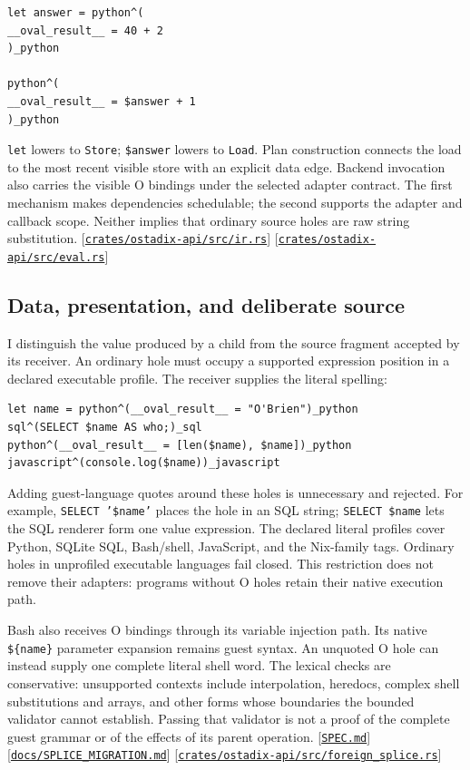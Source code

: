 \documentclass[11pt,oneside]{article}
\newcommand{\src}[1]{\textcolor{OSlate}{\scriptsize[\href{https://github.com/lostadi/OSTADIX/blob/c0b02c326b2329a95ba52447c7180bc93957cd57/#1}{\nolinkurl{#1}}]}\allowbreak}
\begin{document}
\begin{lstlisting}[style=ostyle]
let answer = python^(
__oval_result__ = 40 + 2
)_python

python^(
__oval_result__ = $answer + 1
)_python
\end{lstlisting}

\texttt{let} lowers to \texttt{Store}; \texttt{\$answer} lowers to
\texttt{Load}. Plan construction connects the load to the most recent visible
store with an explicit data edge. Backend invocation also carries the visible O bindings under the selected
adapter contract. The first mechanism makes dependencies schedulable; the
second supports the adapter and callback scope. Neither implies that ordinary
source holes are raw string substitution.
\src{crates/ostadix-api/src/ir.rs} \src{crates/ostadix-api/src/eval.rs}

\subsection{Data, presentation, and deliberate source}

I distinguish the value produced by a child from the source fragment accepted
by its receiver. An ordinary hole must occupy a supported expression position
in a declared executable profile. The receiver supplies the literal spelling:

\begin{lstlisting}[style=ostyle]
let name = python^(__oval_result__ = "O'Brien")_python
sql^(SELECT $name AS who;)_sql
python^(__oval_result__ = [len($name), $name])_python
javascript^(console.log($name))_javascript
\end{lstlisting}

Adding guest-language quotes around these holes is unnecessary and rejected.
For example, \texttt{SELECT '\$name'} places the hole in an SQL string;
\texttt{SELECT \$name} lets the SQL renderer form one value expression.
The declared literal profiles cover Python, SQLite SQL, Bash/shell,
JavaScript, and the Nix-family tags. Ordinary holes in unprofiled executable
languages fail closed. This restriction does not remove their adapters:
programs without O holes retain their native execution path.

Bash also receives O bindings through its variable injection path. Its native
\texttt{\$\{name\}} parameter expansion remains guest syntax. An unquoted O
hole can instead supply one complete literal shell word. The lexical checks
are conservative: unsupported contexts include interpolation, heredocs,
complex shell substitutions and arrays, and other forms whose boundaries the
bounded validator cannot establish. Passing that validator is not a proof of
the complete guest grammar or of the effects of its parent operation.
\src{SPEC.md}
\src{docs/SPLICE_MIGRATION.md}
\src{crates/ostadix-api/src/foreign_splice.rs}
\end{document}
